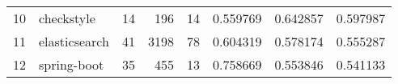 \begin{tabular}{llrrrrrr}
10 &         checkstyle &                         14 &                        196 &                                 14 &                    0.559769 &                 0.642857 &             0.597987 \\
11 &      elasticsearch &                         41 &                       3198 &                                 78 &                    0.604319 &                 0.578174 &             0.555287 \\
12 &        spring-boot &                         35 &                        455 &                                 13 &                    0.758669 &                 0.553846 &             0.541133 \\
\bottomrule
\end{tabular}
